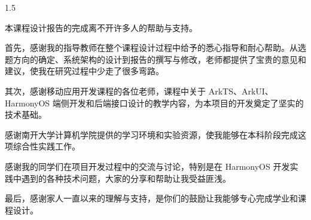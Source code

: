 
\renewcommand{\thepage}{\arabic{page}}
\begin{zhixie}
\begin{spacing}{1.5}

本课程设计报告的完成离不开许多人的帮助与支持。

首先，感谢我的指导教师在整个课程设计过程中给予的悉心指导和耐心帮助。从选题方向的确定、系统架构的设计到报告的撰写与修改，老师都提供了宝贵的意见和建议，使我在研究过程中少走了很多弯路。

其次，感谢移动应用开发课程的各位老师，课程中关于 ArkTS、ArkUI、HarmonyOS 端侧开发和后端接口设计的教学内容，为本项目的开发奠定了坚实的技术基础。

感谢南开大学计算机学院提供的学习环境和实验资源，使我能够在本科阶段完成这项综合性实践工作。

感谢我的同学们在项目开发过程中的交流与讨论，特别是在 HarmonyOS 开发实践中遇到的各种技术问题，大家的分享和帮助让我受益匪浅。

最后，感谢家人一直以来的理解与支持，是你们的鼓励让我能够专心完成学业和课程设计。

\end{spacing}
\end{zhixie}
